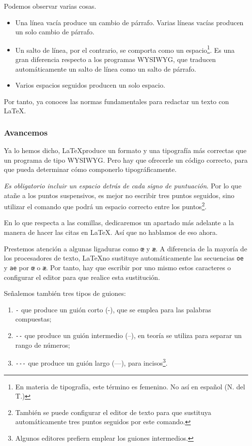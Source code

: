 Podemos observar varias cosas.
\begin{itemize}
\item Una línea vacía produce un cambio de párrafo. Varias líneas vacías producen un solo cambio de párrafo.
\item Un salto de línea, por el contrario, se comporta como un espacio\footnote{En materia de tipografía, este término es femenino. No así en español (N. del T.)}. Es una gran diferencia respecto a los programas WYSIWYG, que traducen automáticamente un salto de línea como un salto de párrafo.
\item Varios espacios seguidos producen un solo espacio. 
\end{itemize}

Por tanto, ya conoces las normas fundamentales para redactar un texto con \LaTeX.

\subsubsection{Avancemos}

Ya lo hemos dicho, \LaTeX produce un formato y una tipografía más correctas que un programa de tipo WYSIWYG. Pero hay que ofrecerle un código correcto, para que pueda determinar cómo componerlo tipográficamente.


\emph{Es obligatorio incluir un espacio detrás de cada signo de puntuación}. Por lo que atañe a los puntos suspensivos, es mejor no escribir tres puntos seguidos, sino utilizar el comando  que podrá un espacio correcto entre los puntos\footnote{También se puede configurar el editor de texto para que sustituya automáticamente tres puntos seguidos por este comando.}.

En lo que respecta a las comillas, dedicaremos un apartado más adelante a la manera de hacer las citas en \LaTeX. Así que no hablamos de eso ahora.

Prestemos atención a algunas ligaduras como \verb|œ| y  \verb|æ|. A diferencia de la mayoría de los procesadores de texto, \LaTeX no sustituye automáticamente las secuencias \verb|oe| y \verb|ae| por \verb|œ| o \verb|æ|. Por tanto, hay que escribir por uno mismo estos caracteres o configurar el editor para que realice esta sustitución.

Señalemos también tres tipos de guiones\label{tirets}:
\begin{enumerate}
\item \verb|-| que produce un guión corto (-), que se emplea para las palabras compuestas;
\item \verb|--| que produce un guión intermedio (--), en teoría se utiliza para separar un rango de números;
\item \verb|---| que produce un guión largo (---), para incisos\footnote{Algunos editores prefiern emplear los guiones intermedios.}.
\end{enumerate}
 
